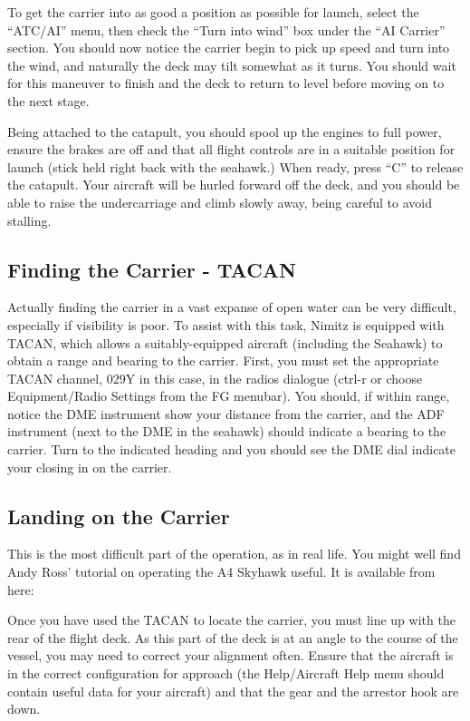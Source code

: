 To get the carrier into as good a position as possible for launch, select the ``ATC/AI'' menu, then
check the ``Turn into wind'' box under the ``AI Carrier'' section. You should now notice the carrier
begin to pick up speed and turn into the wind, and naturally the deck may tilt somewhat as it turns.
You should wait for this maneuver to finish and the deck to return to level before moving on to the next stage.

Being attached to the catapult, you should spool up the engines to full power, ensure the brakes are off
and that all flight controls are in a suitable position for launch (stick held right back with the seahawk.)
When ready, press ``C'' to release the catapult. Your aircraft will be hurled forward off the deck, and
you should be able to raise the undercarriage and climb slowly away, being careful to avoid stalling.

\subsection{Finding the Carrier - TACAN}

Actually finding the carrier in a vast expanse of open water can be very difficult, especially if visibility
is poor. To assist with this task, Nimitz is equipped with TACAN, which allows a suitably-equipped
aircraft (including the Seahawk) to obtain a range and bearing to the carrier. First, you must set
the appropriate TACAN channel, 029Y in this case, in the radios dialogue (ctrl-r or choose
Equipment/Radio Settings from the FG menubar). You should, if within range, notice the DME instrument
show your distance from the carrier, and the ADF instrument (next to the DME in the seahawk) should
indicate a bearing to the carrier. Turn to the indicated heading and you should see the DME dial
indicate your closing in on the carrier.

\subsection{Landing on the Carrier}

This is the most difficult part of the operation, as in real life. You might well find Andy Ross' tutorial on
operating the A4 Skyhawk useful. It is available from here:

\noindent
{}

Once you have used the TACAN to locate the carrier, you must
line up with the rear of the flight deck. As this part of the deck is at an angle to the course of the vessel,
you may need to correct your alignment often. Ensure that the aircraft is in the correct configuration for
approach (the Help/Aircraft Help menu should contain useful data for your aircraft) and that the gear and
the arrestor hook are down.

